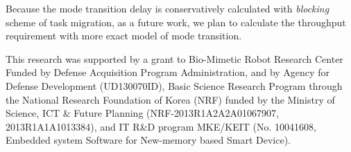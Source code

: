 \documentclass[prodmode,acmtecs]{acmsmall}
\begin{document}
Because the mode transition delay is conservatively calculated with \textit{blocking} scheme of task migration, as a future work, we plan to calculate the throughput requirement with more exact model of mode transition.

\begin{acks}
This research was supported by a grant to Bio-Mimetic Robot Research Center Funded by Defense Acquisition Program Administration, and by Agency for Defense Development (UD130070ID), Basic Science Research Program through the National Research Foundation of Korea (NRF) funded by the Ministry of Science, ICT \& Future Planning (NRF-2013R1A2A2A01067907, 2013R1A1A1013384), and IT R\&D program MKE/KEIT (No. 10041608, Embedded system Software for New-memory based Smart Device).
\end{acks}





\medskip
\end{document}
